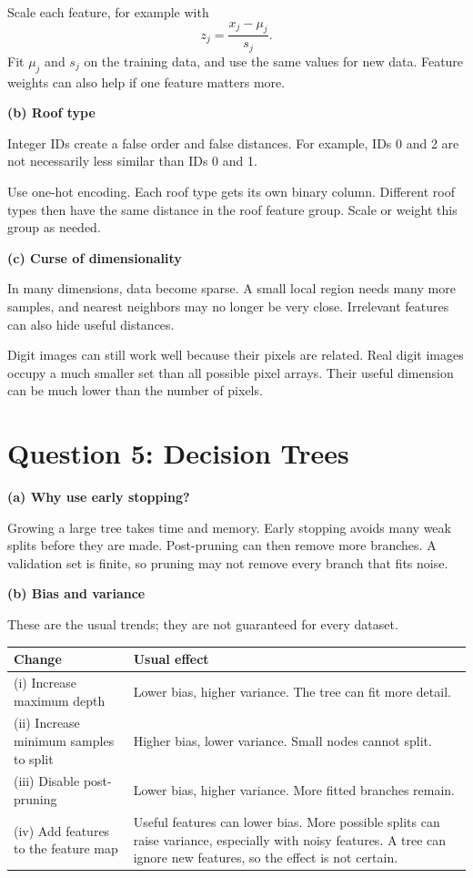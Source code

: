 \documentclass[11pt]{article}
\newcommand{\parttitle}[1]{\par\textbf{#1}\par}
\begin{document}
Scale each feature, for example with
\[
z_j=\frac{x_j-\mu_j}{s_j}.
\]
Fit $\mu_j$ and $s_j$ on the training data, and use the same values for new data. Feature weights can also help if one feature matters more.

\parttitle{(b) Roof type}
Integer IDs create a false order and false distances. For example, IDs 0 and 2 are not necessarily less similar than IDs 0 and 1.

Use one-hot encoding. Each roof type gets its own binary column. Different roof types then have the same distance in the roof feature group. Scale or weight this group as needed.

\parttitle{(c) Curse of dimensionality}
In many dimensions, data become sparse. A small local region needs many more samples, and nearest neighbors may no longer be very close. Irrelevant features can also hide useful distances.

Digit images can still work well because their pixels are related. Real digit images occupy a much smaller set than all possible pixel arrays. Their useful dimension can be much lower than the number of pixels.

\newpage
\section*{Question 5: Decision Trees}
\parttitle{(a) Why use early stopping?}
Growing a large tree takes time and memory. Early stopping avoids many weak splits before they are made. Post-pruning can then remove more branches. A validation set is finite, so pruning may not remove every branch that fits noise.

\parttitle{(b) Bias and variance}
These are the usual trends; they are not guaranteed for every dataset.
\begin{center}
\begin{tabular}{p{}p{}}
\toprule
Change & Usual effect\\
\midrule
(i) Increase maximum depth & Lower bias, higher variance. The tree can fit more detail.\\[6pt]
(ii) Increase minimum samples to split & Higher bias, lower variance. Small nodes cannot split.\\[6pt]
(iii) Disable post-pruning & Lower bias, higher variance. More fitted branches remain.\\[6pt]
(iv) Add features to the feature map & Useful features can lower bias. More possible splits can raise variance, especially with noisy features. A tree can ignore new features, so the effect is not certain.\\
\bottomrule
\end{tabular}
\end{center}
\end{document}
